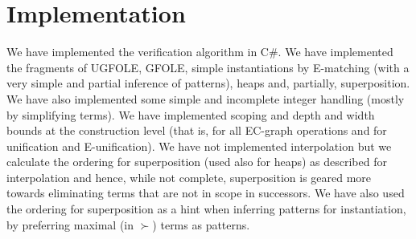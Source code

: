 \section{Implementation}
We have implemented the verification algorithm in C\#. We have implemented the fragments of UGFOLE, GFOLE, simple instantiations by E-matching (with a very simple and partial inference of patterns), heaps and, partially, superposition. 
We have also implemented some simple and incomplete integer handling (mostly by simplifying terms). 
We have implemented scoping and depth and width bounds at the construction level (that is, for all EC-graph operations and for unification and E-unification). We have not implemented interpolation but we calculate the ordering for superposition (used also for heaps) as described for interpolation and hence, while not complete, superposition is geared more towards eliminating terms that are not in scope in successors. We have also used the ordering for superposition as a hint when inferring patterns for instantiation, by preferring maximal (in $\succ$) terms as patterns.

